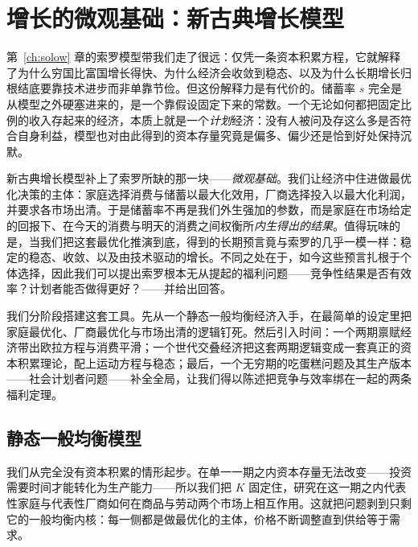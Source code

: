 \chapter{增长的微观基础：新古典增长模型}
\label{ch:neoclassical}

第~\ref{ch:solow} 章的索罗模型带我们走了很远：仅凭一条资本积累方程，它就解释了为什么穷国比富国增长得快、为什么经济会收敛到稳态、以及为什么长期增长归根结底要靠技术进步而非单靠节俭。但这份解释力是有代价的。储蓄率 $s$ 完全是从模型之外硬塞进来的，是一个靠假设固定下来的常数。一个无论如何都把固定比例的收入存起来的经济，本质上就是一个\emph{计划}经济：没有人被问及存这么多是否符合自身利益，模型也对由此得到的资本存量究竟是偏多、偏少还是恰到好处保持沉默。

新古典增长模型补上了索罗所缺的那一块——\emph{微观基础}。我们让经济中住进做最优化决策的主体：家庭选择消费与储蓄以最大化效用，厂商选择投入以最大化利润，并要求各市场出清。于是储蓄率不再是我们外生强加的参数，而是家庭在市场给定的回报下、在今天的消费与明天的消费之间权衡所\emph{内生得出的结果}。值得玩味的是，当我们把这套最优化推演到底，得到的长期预言竟与索罗的几乎一模一样：稳定的稳态、收敛、以及由技术驱动的增长。不同之处在于，如今这些预言扎根于个体选择，因此我们可以提出索罗根本无从提起的福利问题——竞争性结果是否有效率？计划者能否做得更好？——并给出回答。

我们分阶段搭建这套工具。先从一个静态一般均衡经济入手，在最简单的设定里把家庭最优化、厂商最优化与市场出清的逻辑钉死。然后引入时间：一个两期禀赋经济带出欧拉方程与消费平滑；一个世代交叠经济把这套两期逻辑变成一套真正的资本积累理论，配上运动方程与稳态；最后，一个无穷期的吃蛋糕问题及其生产版本——社会计划者问题——补全全局，让我们得以陈述把竞争与效率绑在一起的两条福利定理。

\section{静态一般均衡模型}

我们从完全没有资本积累的情形起步。在单一一期之内资本存量无法改变——投资需要时间才能转化为生产能力——所以我们把 $K$ 固定住，研究在这一期之内代表性家庭与代表性厂商如何在商品与劳动两个市场上相互作用。这就把问题剥到只剩它的一般均衡内核：每一侧都是做最优化的主体，价格不断调整直到供给等于需求。


